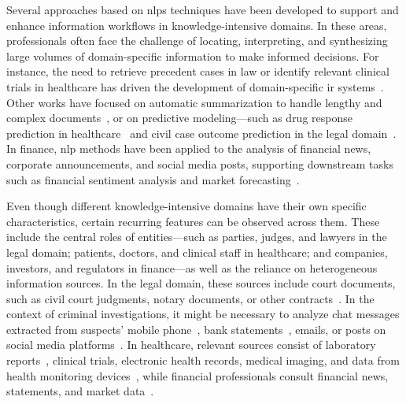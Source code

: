 Several approaches based on \acfp{nlp} techniques have been developed to support and enhance information workflows in knowledge-intensive domains. In these areas, professionals often face the challenge of locating, interpreting, and synthesizing large volumes of domain-specific information to make informed decisions. For instance, the need to retrieve precedent cases in law or identify relevant clinical trials in healthcare has driven the development of domain-specific \acf{ir} systems~\cite{moens2001innovative,breuker2004legal,hersh2003trec,roberts2016overview}. Other works have focused on automatic summarization to handle lengthy and complex documents~\cite{llms_in_law_2025,clinical_summarization_2023}, or on predictive modeling---such as drug response prediction in healthcare~\cite{sharma2024advances} and civil case outcome prediction in the legal domain~\cite{juliahb2024}. In finance, \ac{nlp} methods have been applied to the analysis of financial news, corporate announcements, and social media posts, supporting downstream tasks such as financial sentiment analysis and market forecasting~\cite{nlp_finance_survey_2025}.

Even though different knowledge-intensive domains have their own specific characteristics, certain recurring features can be observed across them. These include the central roles of entities---such as parties, judges, and lawyers in the legal domain; patients, doctors, and clinical staff in healthcare; and companies, investors, and regulators in finance---as well as the reliance on heterogeneous information sources. In the legal domain, these sources include court documents, such as civil court judgments, notary documents, or other contracts~\cite{HAN2024121052legalasst,amato2008,buey2016}. In the context of criminal investigations, it might be necessary to analyze chat messages extracted from suspects' mobile phone~\cite{subbulakshmi2024forensic,pirzada2024framework,kaushik2022forensic,Sonakshi_whatsapp_group_2025},  bank statements~\cite{data_mining_money_laundering_2003}, emails, or posts on social media platforms~\cite{jarrett2021impact}. In healthcare, relevant sources consist of laboratory reports~\cite{lab_reports_2023}, clinical trials, electronic health records, medical imaging, and data from health monitoring devices~\cite{XIAO2024108577}, while financial professionals consult financial news, statements, and market data~\cite{nlp_finance_survey_2025}.


